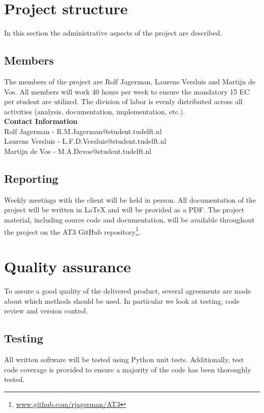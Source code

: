 \section{Project structure}

In this section the administrative aspects of the project are described.

\subsection{Members}
The members of the project are Rolf Jagerman, Laurens Versluis and Martijn de Vos. All members will work 40 hours per week to ensure the mandatory 15 EC per student are utilized. The division of labor is evenly distributed across all activities (analysis, documentation, implementation, etc.).\\

\noindent\textbf{Contact Information}\\
Rolf Jagerman - R.M.Jagerman@student.tudelft.nl\\
Laurens Versluis - L.F.D.Versluis@student.tudelft.nl\\
Martijn de Vos - M.A.Devos@student.tudelft.nl

\subsection{Reporting}
Weekly meetings with the client will be held in person. All documentation of the project will be written in {\LaTeX} and will be provided as a PDF. The project material, including source code and documentation, will be available throughout the project on the AT3 GitHub repository\footnote{\href{http://www.github.com/rjagerman/AT3/}{www.github.com/rjagerman/AT3}}.

\section{Quality assurance}

To assure a good quality of the delivered product, several agreements are made about which methods should be used. In particular we look at testing, code review and version control.

\subsection{Testing}
All written software will be tested using Python unit tests. Additionally, test code coverage is provided to ensure a majority of the code has been thoroughly tested.

